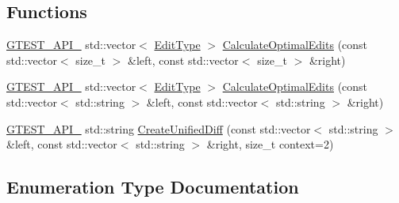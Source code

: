 \subsection*{Functions}
\begin{DoxyCompactItemize}
\item 
\mbox{\hyperlink{_obj__test_2lib_2googletest-release-1_88_81_2googletest_2include_2gtest_2internal_2gtest-port_8h_aa73be6f0ba4a7456180a94904ce17790}{G\+T\+E\+S\+T\+\_\+\+A\+P\+I\+\_\+}} std\+::vector$<$ \mbox{\hyperlink{namespacetesting_1_1internal_1_1edit__distance_ad46aa6da12aec1a3f166310478b53a08}{Edit\+Type}} $>$ \mbox{\hyperlink{namespacetesting_1_1internal_1_1edit__distance_a26323b4c2a29ea8e187aafbd4d2275db}{Calculate\+Optimal\+Edits}} (const std\+::vector$<$ size\+\_\+t $>$ \&left, const std\+::vector$<$ size\+\_\+t $>$ \&right)
\item 
\mbox{\hyperlink{_obj__test_2lib_2googletest-release-1_88_81_2googletest_2include_2gtest_2internal_2gtest-port_8h_aa73be6f0ba4a7456180a94904ce17790}{G\+T\+E\+S\+T\+\_\+\+A\+P\+I\+\_\+}} std\+::vector$<$ \mbox{\hyperlink{namespacetesting_1_1internal_1_1edit__distance_ad46aa6da12aec1a3f166310478b53a08}{Edit\+Type}} $>$ \mbox{\hyperlink{namespacetesting_1_1internal_1_1edit__distance_a32267b2ae24de1de175ac8217406877d}{Calculate\+Optimal\+Edits}} (const std\+::vector$<$ std\+::string $>$ \&left, const std\+::vector$<$ std\+::string $>$ \&right)
\item 
\mbox{\hyperlink{_obj__test_2lib_2googletest-release-1_88_81_2googletest_2include_2gtest_2internal_2gtest-port_8h_aa73be6f0ba4a7456180a94904ce17790}{G\+T\+E\+S\+T\+\_\+\+A\+P\+I\+\_\+}} std\+::string \mbox{\hyperlink{namespacetesting_1_1internal_1_1edit__distance_ac4c24a581ff433d7aca7ed12c9133fb1}{Create\+Unified\+Diff}} (const std\+::vector$<$ std\+::string $>$ \&left, const std\+::vector$<$ std\+::string $>$ \&right, size\+\_\+t context=2)
\end{DoxyCompactItemize}


\subsection{Enumeration Type Documentation}
\mbox{\label{namespacetesting_1_1internal_1_1edit__distance_ad46aa6da12aec1a3f166310478b53a08}} 
